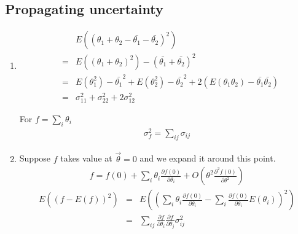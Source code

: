 \documentclass{article}
\begin{document}
\subsection{Propagating uncertainty}
\begin{enumerate}
\item
\begin{eqnarray}
&&E((\theta_1+\theta_2-\bar{\theta_1}-\bar{\theta_2})^2)\nonumber\\
&=&E((\theta_1+\theta_2)^2)-(\bar{\theta_1}+\bar{\theta_2})^2\nonumber\\
&=&E(\theta_1^2)-\bar{\theta_1}^2+E(\theta_2^2)-\bar{\theta_2}^2+2(E(\theta_1\theta_2)-\bar{\theta_1}\bar{\theta_2})\nonumber\\
&=&\sigma_{11}^2+\sigma_{22}^2+2\sigma_{12}^2
\end{eqnarray}

For $f=\sum_i\theta_i$
\begin{eqnarray}
\sigma_f^2=\sum_{ij}\sigma_{ij}
\end{eqnarray}
\item
Suppose $f$ takes value at $\vec{\theta}=0$ and we expand it around this point.
\begin{eqnarray}
f=f(0)+\sum_i\theta_i\frac{\partial f(0)}{\partial\theta_i}+O(\theta^2\frac{\partial^2f(0)}{\partial\theta^2})
\end{eqnarray}
\begin{eqnarray}
E((f-E(f))^2)&=&E((\sum_i\theta_i\frac{\partial f(0)}{\partial\theta_i}-\sum_i\frac{\partial f(0)}{\partial\theta_i}E(\theta_i))^2)\nonumber\\
&=&\sum_{ij}\frac{\partial f}{\partial\theta_i}\frac{\partial f}{\partial\theta_j}\sigma_{ij}^2
\end{eqnarray}
\end{enumerate}
\end{document}
